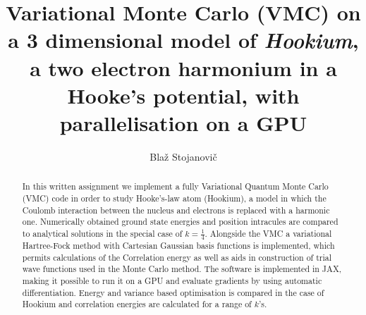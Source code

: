 \documentclass[final,3p,times,twocolumn]{elsarticle}
\begin{document}
	
	\begin{frontmatter}
		
		
		
		\title{Variational Monte Carlo (VMC) on a 3 dimensional model of \emph{Hookium}, a two electron harmonium in a Hooke’s potential, with parallelisation on a GPU}
		
		
		\author{Bla\v z Stojanovi\v c}
		
		\address{Cavendish Laboratory, Department of Physics, J J Thomson
			Avenue, Cambridge. CB3 0HE}
		
		\begin{abstract}
			In this written assignment we implement a fully Variational Quantum Monte Carlo (VMC) code in order to study Hooke's-law atom (Hookium), a model in which the Coulomb interaction between the nucleus and electrons is replaced with a harmonic one. Numerically obtained ground state energies and position intracules are compared to analytical solutions in the special case of $k=\frac{1}{4}$. Alongside the VMC a variational Hartree-Fock method with Cartesian Gaussian basis functions is implemented, which permits calculations of the Correlation energy as well as aids in construction of trial wave functions used in the Monte Carlo method. The software is implemented in JAX, making it possible to run it on a GPU and evaluate gradients by using automatic differentiation. Energy and variance based optimisation is compared in the case of Hookium and correlation energies are calculated for a range of $k$'s. 
		\end{abstract}
	\end{frontmatter}
	
\end{document}
